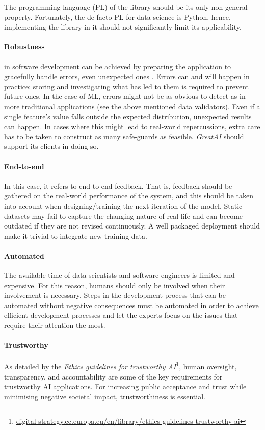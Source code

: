 The programming language (PL) of the library should be its only non-general property. Fortunately, the de facto PL for data science is Python, hence, implementing the library in it should not significantly limit its applicability.

\paragraph{Robustness} in software development can be achieved by preparing the application to gracefully handle errors, even unexpected ones \cite{bishop1998robust}. Errors can and will happen in practice: storing and investigating what has led to them is required to prevent future ones. In the case of ML, errors might not be as obvious to detect as in more traditional applications (see the above mentioned data validators). Even if a single feature's value falls outside the expected distribution, unexpected results can happen. In cases where this might lead to real-world repercussions, extra care has to be taken to construct as many safe-guards as feasible. \textit{GreatAI} should support its clients in doing so.

\paragraph{End-to-end} In this case, it refers to end-to-end feedback. That is, feedback should be gathered on the real-world performance of the system, and this should be taken into account when designing/training the next iteration of the model. Static datasets may fail to capture the changing nature of real-life and can become outdated if they are not revised continuously. A well packaged deployment should make it trivial to integrate new training data.

\paragraph{Automated} The available time of data scientists and software engineers is limited and expensive. For this reason, humans should only be involved when their involvement is necessary. Steps in the development process that can be automated without negative consequences must be automated in order to achieve efficient development processes and let the experts focus on the issues that require their attention the most.

\paragraph{Trustworthy} As detailed by the \textit{Ethics guidelines for trustworthy AI}\footnote{\href{https://digital-strategy.ec.europa.eu/en/library/ethics-guidelines-trustworthy-ai}{digital-strategy.ec.europa.eu/en/library/ethics-guidelines-trustworthy-ai}}, human oversight, transparency, and accountability are some of the key requirements for trustworthy AI applications. For increasing public acceptance and trust while minimising negative societal impact, trustworthiness is essential.

